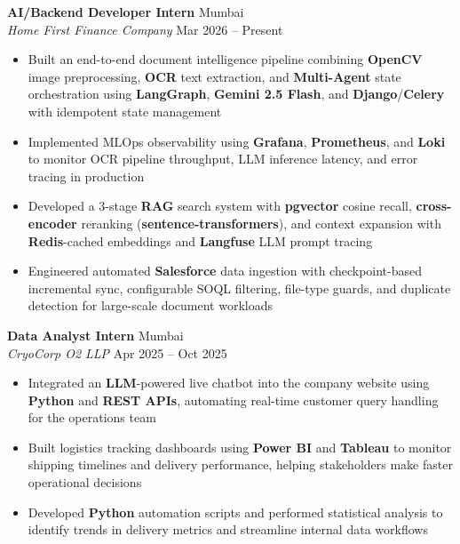 \documentclass[10pt,a4paper]{article}
\begin{document}
\textbf{AI/Backend Developer Intern} \hfill Mumbai\\
\textit{Home First Finance Company} \hfill Mar 2026 -- Present
\begin{itemize}
    \item Built an end-to-end document intelligence pipeline combining \textbf{OpenCV} image preprocessing, \textbf{OCR} text extraction, and \textbf{Multi-Agent} state orchestration using \textbf{LangGraph}, \textbf{Gemini 2.5 Flash}, and \textbf{Django}/\textbf{Celery} with idempotent state management
    \item Implemented MLOps observability using \textbf{Grafana}, \textbf{Prometheus}, and \textbf{Loki} to monitor OCR pipeline throughput, LLM inference latency, and error tracing in production
    \item Developed a 3-stage \textbf{RAG} search system with \textbf{pgvector} cosine recall, \textbf{cross-encoder} reranking (\textbf{sentence-transformers}), and context expansion with \textbf{Redis}-cached embeddings and \textbf{Langfuse} LLM prompt tracing
    \item Engineered automated \textbf{Salesforce} data ingestion with checkpoint-based incremental sync, configurable SOQL filtering, file-type guards, and duplicate detection for large-scale document workloads
\end{itemize}

\vspace{1pt}

\textbf{Data Analyst Intern} \hfill Mumbai\\
\textit{CryoCorp O2 LLP} \hfill Apr 2025 -- Oct 2025
\begin{itemize}
    \item Integrated an \textbf{LLM}-powered live chatbot into the company website using \textbf{Python} and \textbf{REST APIs}, automating real-time customer query handling for the operations team
    \item Built logistics tracking dashboards using \textbf{Power BI} and \textbf{Tableau} to monitor shipping timelines and delivery performance, helping stakeholders make faster operational decisions
    \item Developed \textbf{Python} automation scripts and performed statistical analysis to identify trends in delivery metrics and streamline internal data workflows
\end{itemize}

\vspace{1pt}
\end{document}
